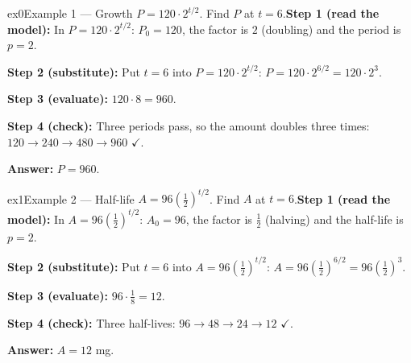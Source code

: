 \documentclass[11pt]{article}
\begin{document}
\begin{example}{ex0}{Example 1 --- Growth}
$P=120\cdot2^{t/2}$. Find $P$ at $t=6$.\soln \textbf{Step 1 (read the model):} In $P=120\cdot2^{t/2}$: $P_0=120$, the factor is $2$ (doubling) and the period is $p=2$.

\textbf{Step 2 (substitute):} Put $t=6$ into $P=120\cdot2^{t/2}$: $P=120\cdot2^{6/2}=120\cdot2^3$.

\textbf{Step 3 (evaluate):} $120\cdot8=960$.

\textbf{Step 4 (check):} Three periods pass, so the amount doubles three times: $120\to240\to480\to960$ $\checkmark$.

\textbf{Answer:} $P=960$.

\end{example}

\begin{example}{ex1}{Example 2 --- Half-life}
$A=96\left(\tfrac12\right)^{t/2}$. Find $A$ at $t=6$.\soln \textbf{Step 1 (read the model):} In $A=96\left(\tfrac12\right)^{t/2}$: $A_0=96$, the factor is $\tfrac12$ (halving) and the half-life is $p=2$.

\textbf{Step 2 (substitute):} Put $t=6$ into $A=96\left(\tfrac12\right)^{t/2}$: $A=96\left(\tfrac12\right)^{6/2}=96\left(\tfrac12\right)^3$.

\textbf{Step 3 (evaluate):} $96\cdot\tfrac18=12$.

\textbf{Step 4 (check):} Three half-lives: $96\to48\to24\to12$ $\checkmark$.

\textbf{Answer:} $A=12$ mg.

\end{example}
\end{document}
